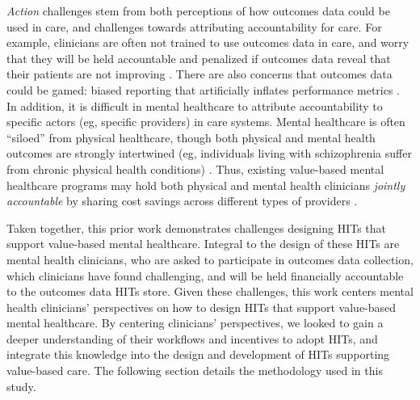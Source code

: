\textit{Action} challenges stem from both perceptions of how outcomes data could be used in care, and challenges towards attributing accountability for care.
For example, clinicians are often not trained to use outcomes data in care, and worry that they will be held accountable and penalized if outcomes data reveal that their patients are not improving \cite{lewis_implementing_2019, desimone_impact_2023}.
There are also concerns that outcomes data could be gamed: biased reporting that artificially inflates performance metrics \cite{kilbourne_measuring_2018}.
In addition, it is difficult in mental healthcare to attribute accountability to specific actors (eg, specific providers) in care systems.
Mental healthcare is often ``siloed'' from physical healthcare, though both physical and mental health outcomes are strongly intertwined (eg, individuals living with schizophrenia suffer from chronic physical health conditions) \cite{pincus_quality_2016}.
Thus, existing value-based mental healthcare programs may hold both physical and mental health clinicians \textit{jointly accountable} by sharing cost savings across different types of providers \cite{hobbs_knutson_driving_2021}.

Taken together, this prior work demonstrates challenges designing HITs that support value-based mental healthcare.
Integral to the design of these HITs are mental health clinicians, who are asked to participate in outcomes data collection, which clinicians have found challenging, and will be held financially accountable to the outcomes data HITs store.
Given these challenges, this work centers mental health clinicians' perspectives on how to design HITs that support value-based mental healthcare.
By centering clinicians' perspectives, we looked to gain a deeper understanding of their workflows and incentives to adopt HITs, and integrate this knowledge into the design and development of HITs supporting value-based care. 
The following section details the methodology used in this study.